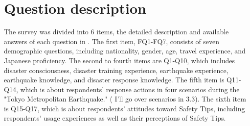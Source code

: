\section{Question description}
The survey was divided into 6 items, the detailed description and available answers of each question in . 
The first item, FQ1-FQ7, consists of seven demographic questions, including nationality, gender, age, travel experience, and Japanese proficiency. The second to fourth items are Q1-Q10, which includes disaster consciousness, disaster training experience, earthquake experience, earthquake knowledge, and disaster response knowledge. The fifth item is Q11-Q14, which is about respondents' response actions in four scenarios during the "Tokyo Metropolitan Earthquake." ( I'll go over scenarios in 3.3). The sixth item is Q15-Q17, which is about respondents' attitudes toward Safety Tips, including respondents' usage experiences as well as their perceptions of Safety Tips.

